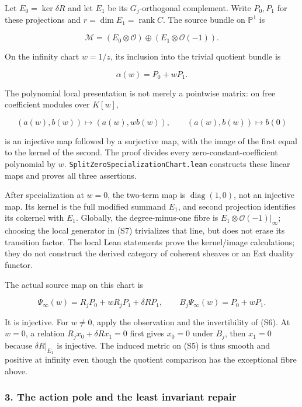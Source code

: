 Let \(E_0=\ker\delta R\) and let \(E_1\) be its \(G_j\)-orthogonal complement. Write \(P_0,P_1\) for these projections and \(r=\dim E_1=\operatorname{rank}C\). The source bundle on \(\mathbb P^1\) is

\[
\mathscr M=(E_0\otimes\mathcal O)\oplus(E_1\otimes\mathcal O(-1)).
\tag{S5}
\]

On the infinity chart \(w=1/z\), its inclusion into the trivial quotient bundle is

\[
\alpha(w)=P_0+wP_1.
\tag{S6}
\]

The polynomial local presentation is not merely a pointwise matrix: on free coefficient modules over \(K[w]\),

\[
(a(w),b(w))\longmapsto(a(w),wb(w)),\qquad
(a(w),b(w))\longmapsto b(0)
\tag{S7}
\]

is an injective map followed by a surjective map, with the image of the first equal to the kernel of the second. The proof divides every zero-constant-coefficient polynomial by \(w\). \nolinkurl{SplitZeroSpecializationChart.lean} constructs these linear maps and proves all three assertions.

After specialization at \(w=0\), the two-term map is \(\operatorname{diag}(1,0)\), not an injective map. Its kernel is the full modified summand \(E_1\), and second projection identifies its cokernel with \(E_1\). Globally, the degree-minus-one fibre is \(E_1\otimes\mathcal O(-1)|_\infty\); choosing the local generator in (S7) trivializes that line, but does not erase its transition factor. The local Lean statements prove the kernel/image calculations; they do not construct the derived category of coherent sheaves or an Ext duality functor.

The actual source map on this chart is

\[
\Psi_\infty(w)=R_jP_0+wR_jP_1+\delta RP_1,\qquad
B_j\Psi_\infty(w)=P_0+wP_1.
\tag{S8}
\]

It is injective. For \(w\ne0\), apply the observation and the invertibility of (S6). At \(w=0\), a relation \(R_jx_0+\delta Rx_1=0\) first gives \(x_0=0\) under \(B_j\), then \(x_1=0\) because \(\delta R|_{E_1}\) is injective. The induced metric on (S5) is thus smooth and positive at infinity even though the quotient comparison has the exceptional fibre above.

\subsubsection{3. The action pole and the least invariant repair}\label{endpoint-cc_specialization--the-action-pole-and-the-least-invariant-repair}


